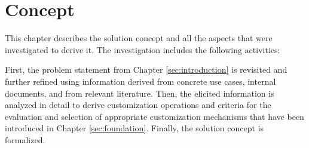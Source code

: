 \section{Concept\label{sec:concept}}

This chapter describes the solution concept and all the aspects that were investigated to derive it.
The investigation includes the following activities:

First, the problem statement from Chapter \ref{sec:introduction} is revisited and further refined
using information derived from concrete use cases, internal documents, and from relevant literature.
Then, the elicited information is analyzed in detail to derive customization operations and
criteria for the evaluation and selection of appropriate customization mechanisms that have been
introduced in Chapter \ref{sec:foundation}. Finally, the solution concept is formalized.


